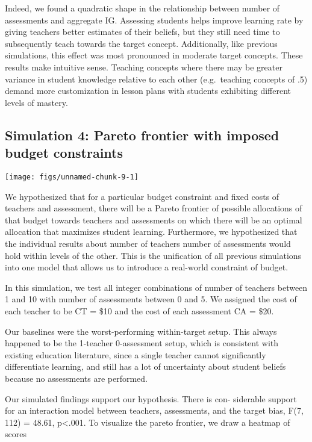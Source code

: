 \documentclass[10pt, letterpaper]{article}
\newenvironment{CodeChunk}{}{}
\begin{document}
Indeed, we found a quadratic shape in the relationship between number of
assessments and aggregate IG. Assessing students helps improve learning
rate by giving teachers better estimates of their beliefs, but they
still need time to subsequently teach towards the target concept.
Additionally, like previous simulations, this effect was most pronounced
in moderate target concepts. These results make intuitive sense.
Teaching concepts where there may be greater variance in student
knowledge relative to each other (e.g.~teaching concepts of .5) demand
more customization in lesson plans with students exhibiting different
levels of mastery.

\subsection{Simulation 4: Pareto frontier with imposed budget
constraints}\label{simulation-4-pareto-frontier-with-imposed-budget-constraints}

\begin{CodeChunk}

\texttt{[image: figs/unnamed-chunk-9-1]} \end{CodeChunk}

We hypothesized that for a particular budget constraint and fixed costs
of teachers and assessment, there will be a Pareto frontier of possible
allocations of that budget towards teachers and assessments on which
there will be an optimal allocation that maximizes student learning.
Furthermore, we hypothesized that the individual results about number of
teachers number of assessments would hold within levels of the other.
This is the unification of all previous simulations into one model that
allows us to introduce a real-world constraint of budget.

In this simulation, we test all integer combinations of number of
teachers between 1 and 10 with number of assessments between 0 and 5. We
assigned the cost of each teacher to be CT = \$10 and the cost of each
assessment CA = \$20.

Our baselines were the worst-performing within-target setup. This always
happened to be the 1-teacher 0-assessment setup, which is consistent
with existing education literature, since a single teacher cannot
significantly differentiate learning, and still has a lot of uncertainty
about student beliefs because no assessments are performed.

Our simulated findings support our hypothesis. There is con- siderable
support for an interaction model between teachers, assessments, and the
target bias, F(7, 112) = 48.61, p\textless{}.001. To visualize the
pareto frontier, we draw a heatmap of scores
\end{document}
